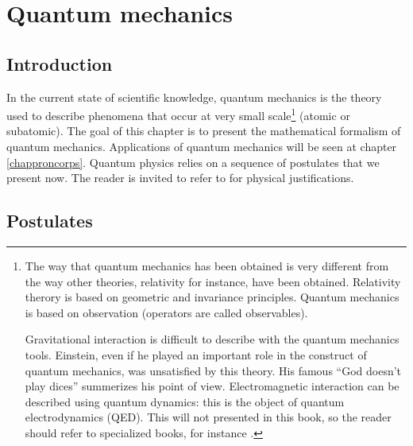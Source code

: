 \documentclass[12pt]{book}
\begin{document}
\chapter{Quantum mechanics}\label{chapmq}

\section{Introduction}
In the current state of scientific knowledge, quantum mechanics is the theory
used to describe phenomena that occur at very small scale\footnote{%
The way that quantum mechanics has been obtained is very different
from the way other theories, relativity for instance, have been
obtained. Relativity therory is based on geometric and invariance
principles. Quantum mechanics is based on observation (operators are
called observables).

Gravitational interaction is difficult to describe with the quantum
mechanics tools. Einstein, even if he played an important role in the
construct of quantum mechanics, was unsatisfied by this theory. His
famous ``God doesn't play dices'' summerizes his point of
view. Electromagnetic interaction can be described using 
quantum dynamics: this is the object of quantum electrodynamics
(QED). This will not presented in this book, so the reader should
refer to specialized books, for instance \cite{ph:mecaq:Cohen87}. 
}%
(atomic or subatomic). 
The goal of this chapter is to present the mathematical formalism of quantum
mechanics. Applications of quantum mechanics will be seen at chapter
\ref{chapproncorps}. Quantum physics relies on a sequence of postulates that
we present now. The reader is invited to refer to
\cite{ph:mecaq:Cohen73,ph:mecaq:Bohm93} for physical justifications.

\section{Postulates}
\end{document}
